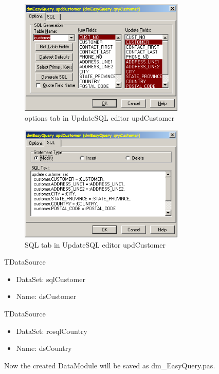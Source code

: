 \documentclass[a4paper,12pt,oneside]{book}
\begin{document}
\begin{figure}[htbp] 
  \centering
  \includegraphics[width=0.7\textwidth]{ZeosTutorial/dmEasyQuery_updCustomer_options.png}
  \caption{options tab in UpdateSQL editor updCustomer}
  \label{fig:dmEasyQuery_updCustomer_options}
\end{figure}

\begin{figure}[htbp] 
  \centering
  \includegraphics[width=0.7\textwidth]{ZeosTutorial/dmEasyQuery_updCustomer_sql.png}
  \caption{SQL tab in UpdateSQL editor updCustomer}
  \label{fig:dmEasyQuery_updCustomer_sql}
\end{figure}
	
TDataSource
\begin{itemize}
  \item DataSet: sqlCustomer
  \item Name: dsCustomer
\end{itemize}

TDataSource
\begin{itemize}
  \item DataSet: rosqlCountry
	\item Name: dsCountry
\end{itemize}

Now the created DataModule will be saved as dm\_EasyQuery.pas.
\end{document}
